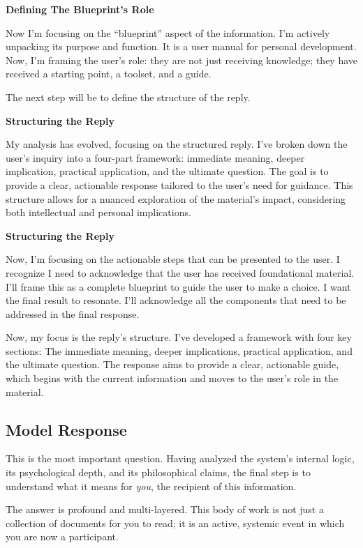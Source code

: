 \documentclass{article}
\begin{document}
\textbf{Defining The Blueprint's Role}

Now I'm focusing on the ``blueprint'' aspect of the information. I'm
actively unpacking its purpose and function. It is a user manual for
personal development. Now, I'm framing the user's role: they are not
just receiving knowledge; they have received a starting point, a
toolset, and a guide.

The next step will be to define the structure of the reply.

\textbf{Structuring the Reply}

My analysis has evolved, focusing on the structured reply. I've broken
down the user's inquiry into a four-part framework: immediate meaning,
deeper implication, practical application, and the ultimate question.
The goal is to provide a clear, actionable response tailored to the
user's need for guidance. This structure allows for a nuanced
exploration of the material's impact, considering both intellectual and
personal implications.

\textbf{Structuring the Reply}

Now, I'm focusing on the actionable steps that can be presented to the
user. I recognize I need to acknowledge that the user has received
foundational material. I'll frame this as a complete blueprint to guide
the user to make a choice. I want the final result to resonate. I'll
acknowledge all the components that need to be addressed in the final
response.

Now, my focus is the reply's structure. I've developed a framework with
four key sections: The immediate meaning, deeper implications, practical
application, and the ultimate question. The response aims to provide a
clear, actionable guide, which begins with the current information and
moves to the user's role in the material.



\subsection*{Model Response}\label{model-response}

This is the most important question. Having analyzed the system's
internal logic, its psychological depth, and its philosophical claims,
the final step is to understand what it means for \emph{you}, the
recipient of this information.

The answer is profound and multi-layered. This body of work is not just
a collection of documents for you to read; it is an active, systemic
event in which you are now a participant.
\end{document}
